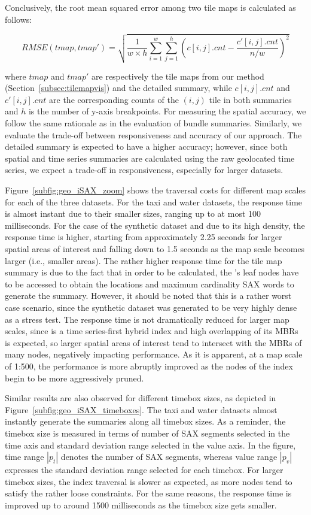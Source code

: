 Conclusively, the root mean squared error among two tile maps is calculated as follows:

\begin{equation} \label{eq:rmse}
RMSE(tmap, tmap') = \sqrt{\frac{1}{w \times h}\displaystyle \sum_{i=1}^{w} \sum_{j=1}^{h}(c[i,j].cnt - \frac{c'[i,j].cnt}{n/w})^2} 
\end{equation}

\noindent where $tmap$ and $tmap'$ are respectively the tile maps from our method (Section~\ref{subsec:tilemapvis}) and the detailed summary, while $c[i,j].cnt$ and $c'[i,j].cnt$ are the corresponding counts of the $(i,j)$ tile in both summaries and $h$ is the number of y-axis breakpoints. For measuring the spatial accuracy, we follow the same rationale as in the evaluation of bundle summaries. Similarly, we evaluate the trade-off between responsiveness and accuracy of our approach. The detailed summary is expected to have a higher accuracy; however, since both spatial and time series summaries are calculated using the raw geolocated time series, we expect a trade-off in responsiveness, especially for larger datasets.

Figure~\ref{subfig:geo_iSAX_zoom} shows the traversal costs for different map scales for each of the three datasets. For the taxi and water datasets, the response time is almost instant due to their smaller sizes, ranging up to at most 100 milliseconds. For the case of the synthetic dataset and due to its high density, the response time is higher, starting from approximately 2.25 seconds for larger spatial areas of interest and falling down to 1.5 seconds as the map scale becomes larger (i.e., smaller areas). The rather higher response time for the tile map summary is due to the fact that in order to be calculated, the \hisax's leaf nodes have to be accessed to obtain the locations and maximum cardinality SAX words to generate the summary. However, it should be noted that this is a rather worst case scenario, since the synthetic dataset was generated to be very highly dense as a stress test. The response time is not dramatically reduced for larger map scales, since \hisax is a time series-first hybrid index and high overlapping of its MBRs is expected, so larger spatial areas of interest tend to intersect with the MBRs of many nodes, negatively impacting performance. As it is apparent, at a map scale of 1:500, the performance is more abruptly improved as the nodes of the index begin to be more aggressively pruned.

Similar results are also observed for different timebox sizes, as depicted in Figure~\ref{subfig:geo_iSAX_timeboxes}. The taxi and water datasets almost instantly generate the summaries along all timebox sizes. As a reminder, the timebox size is measured in terms of number of SAX segments selected in the time axis and standard deviation range selected in the value axis. In the figure, time range $|p_t|$ denotes the number of SAX segments, whereas value range $|p_v|$ expresses the standard deviation range selected for each timebox. For larger timebox sizes, the index traversal is slower as expected, as more nodes tend to satisfy the rather loose constraints. For the same reasons, the response time is improved up to around 1500 milliseconds as the timebox size gets smaller.

